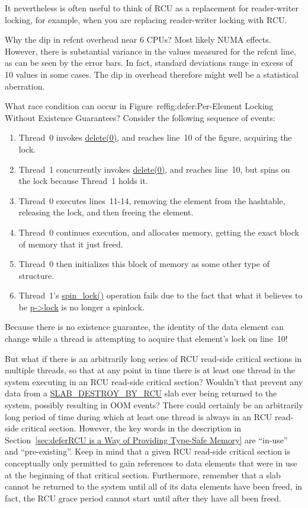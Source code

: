 	It nevertheless is often useful to think of RCU as a replacement
	for reader-writer locking, for example, when you are replacing
	reader-writer locking with RCU.

\QuickQ{}
	Why the dip in refcnt overhead near 6 CPUs?
\QuickA{}
	Most likely NUMA effects.
	However, there is substantial variance in the values measured for the
	refcnt line, as can be seen by the error bars.
	In fact, standard deviations range in excess of 10%
	values in some cases.
	The dip in overhead therefore might well be a statistical aberration.

\QuickQ{}
	What race condition can occur in
	Figure~ref{fig:defer:Per-Element Locking Without Existence Guarantees}?
\QuickA{}
	Consider the following sequence of events:
	\begin{enumerate}
	\item	Thread~0 invokes \url{delete(0)}, and reaches line~10 of
		the figure, acquiring the lock.
	\item	Thread~1 concurrently invokes \url{delete(0)}, and reaches
		line~10, but spins on the lock because Thread~1 holds it.
	\item	Thread~0 executes lines~11-14, removing the element from
		the hashtable, releasing the lock, and then freeing the
		element.
	\item	Thread~0 continues execution, and allocates memory, getting
		the exact block of memory that it just freed.
	\item	Thread~0 then initializes this block of memory as some
		other type of structure.
	\item	Thread~1's \url{spin_lock()} operation fails due to the
		fact that what it believes to be \url{p->lock} is no longer
		a spinlock.
	\end{enumerate}
	Because there is no existence guarantee, the identity of the
	data element can change while a thread is attempting to acquire
	that element's lock on line~10!

\QuickQ{}
	But what if there is an arbitrarily long series of RCU
	read-side critical sections in multiple threads, so that at
	any point in time there is at least one thread in the system
	executing in an RCU read-side critical section?
	Wouldn't that prevent any data from a \url{SLAB_DESTROY_BY_RCU}
	slab ever being returned to the system, possibly resulting
	in OOM events?
\QuickA{}
	There could certainly be an arbitrarily long period of time
	during which at least one thread is always in an RCU read-side
	critical section.
	However, the key words in the description in
	Section~\ref{sec:deferRCU is a Way of Providing Type-Safe Memory}
	are ``in-use'' and ``pre-existing''.
	Keep in mind that a given RCU read-side critical section is
	conceptually only permitted to gain references to data elements
	that were in use at the beginning of that critical section.
	Furthermore, remember that a slab cannot be returned to the
	system until all of its data elements have been freed, in fact,
	the RCU grace period cannot start until after they have all been
	freed.

